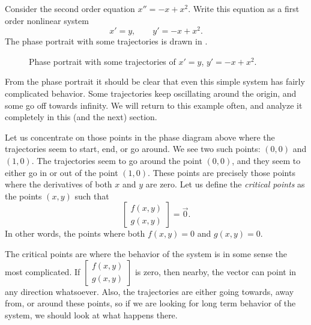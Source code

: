 \begin{example} \label{example:nlin-1b-example}
Consider the second order equation $x''=-x+x^2$.
Write this equation as a first order nonlinear system
\begin{equation*}
x' = y , \qquad y' = -x+x^2 .
\end{equation*}
The phase portrait with some trajectories is drawn in
.
\begin{figure}[h!t]
\capstart
\begin{center}
\caption{Phase portrait with some trajectories of
$x' = y$, $y' = -x+x^2$. \label{fig:nlin-1b}}
\end{center}
\end{figure}

From the phase portrait it should be clear that even this simple system has
fairly complicated behavior.  Some trajectories keep oscillating around the
origin, and some go off towards infinity.  We will return to this example
often, and analyze it completely in this (and the next) section.
\end{example}

Let us concentrate on those points in the phase diagram
above where the trajectories
seem to start, end, or go around.  We see two such points:
$(0,0)$ and $(1,0)$.  The trajectories seem to go around the point $(0,0)$,
and they seem to either go in or out of the point $(1,0)$.
%
These points are precisely those points where the derivatives of both $x$
and $y$ are zero.  Let us define the \emph{critical points}
as the points $(x,y)$ such that
\begin{equation*} 
\begin{bmatrix} f(x,y) \\ g(x,y) \end{bmatrix} = \vec{0} .
\end{equation*}
In other words, the points where both $f(x,y)=0$ and $g(x,y)=0$.

The critical points are where the behavior of the system is
in some sense the most complicated.  If
$\left[ \begin{smallmatrix} f(x,y) \\ g(x,y) \end{smallmatrix} \right]$
is zero, then nearby, the vector can point in any direction whatsoever.
Also, the trajectories are either going towards, away from, or around these
points, so if we are looking for long term behavior of the system, we
should look at what happens there.

